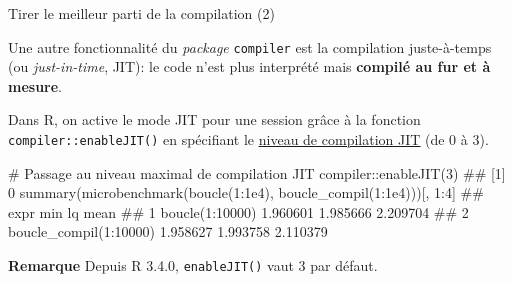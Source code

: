 \documentclass[12pt,ignorenonframetext,handout,]{beamer}
\newenvironment{Shaded}{}{}
\newcommand{\CommentTok}[1]{\textcolor[rgb]{0.00,0.50,0.00}{#1}}
\newcommand{\DecValTok}[1]{#1}
\newcommand{\FloatTok}[1]{#1}
\newcommand{\KeywordTok}[1]{\textcolor[rgb]{0.00,0.00,1.00}{#1}}
\newcommand{\NormalTok}[1]{#1}
\newcommand{\OperatorTok}[1]{#1}
\renewenvironment{Shaded}{\begin{snugshade}}{\end{snugshade}}
\newcommand{\intertitre}[1]{\textcolor{redInsee}{\textbf{#1}}}
\begin{document}
\begin{frame}[fragile]{Tirer le meilleur parti de la compilation (2)}
\protect\hypertarget{tirer-le-meilleur-parti-de-la-compilation-2}{}

Une autre fonctionnalité du \emph{package} \texttt{compiler} est la
compilation \og juste-à-temps \fg{} (ou \textit{just-in-time}, JIT): le
code n’est plus interprété mais \textbf{compilé au fur et à mesure}.

\bigskip \pause Dans R, on active le mode JIT pour une session grâce à
la fonction \texttt{compiler::enableJIT()} en spécifiant le
\href{https://stat.ethz.ch/R-manual/R-devel/library/compiler/html/compile.html}{\underline{niveau de compilation JIT}}
(de 0 à 3).

\pause \footnotesize

\begin{Shaded}
\begin{Highlighting}[]
\CommentTok{# Passage au niveau maximal de compilation JIT}
\NormalTok{compiler}\OperatorTok{::}\KeywordTok{enableJIT}\NormalTok{(}\DecValTok{3}\NormalTok{)}
\NormalTok{  ## [1] 0}
\KeywordTok{summary}\NormalTok{(}\KeywordTok{microbenchmark}\NormalTok{(}\KeywordTok{boucle}\NormalTok{(}\DecValTok{1}\OperatorTok{:}\FloatTok{1e4}\NormalTok{), }\KeywordTok{boucle_compil}\NormalTok{(}\DecValTok{1}\OperatorTok{:}\FloatTok{1e4}\NormalTok{)))[, }\DecValTok{1}\OperatorTok{:}\DecValTok{4}\NormalTok{]}
\NormalTok{  ##                     expr      min       lq     mean}
\NormalTok{  ## 1        boucle(1:10000) 1.960601 1.985666 2.209704}
\NormalTok{  ## 2 boucle_compil(1:10000) 1.958627 1.993758 2.110379}
\end{Highlighting}
\end{Shaded}

\pause \small \intertitre{Remarque} Depuis R 3.4.0, \texttt{enableJIT()}
vaut 3 par défaut.

\end{frame}
\end{document}
